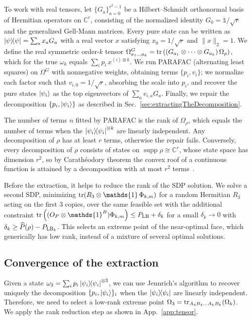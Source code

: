 \documentclass[aps,pra,twocolumn,showpacs,superscriptaddress,groupedaddress]{revtex4-2}
\newcommand{\ot}[0]{\otimes}
\newcommand{\one}[0]{\mathds{1}}
\newcommand{\C}{\mathds{C}}
\newcommand{\I}{\one}
\begin{document}
\begin{widetext}
To work with real tensors, let $\{G_a\}_{a=0}^{r^2-1}$ be a Hilbert--Schmidt orthonormal basis of Hermitian operators on $\C^r$, consisting of the normalized identity $G_0=\I/\sqrt r$ and the generalized Gell-Mann matrices. Every pure state can be written as $\dyad{\psi}=\sum_ax_aG_a$ with a real vector $x$ satisfying $x_0=1/\sqrt r$ and $\|x\|_2=1$. We define the real symmetric order-$k$ tensor $\Omega^G_{a_1\dots a_k}=\tr\left((G_{a_1}\otimes\dots\otimes G_{a_k})\,\Omega_\rho\right)$, which for the true $\omega_k$ equals $\sum_ip_i\,x^{(i)\otimes k}$. We run PARAFAC (alternating least squares) on $\Omega^G$ with nonnegative weights, obtaining terms $\{p_i,v_i\}$; we normalize each factor such that $v_{i,0}=1/\sqrt r$, absorbing the scale into $p_i$, and recover the pure states $\ket{\psi_i}$ as the top eigenvectors of $\sum_av_{i,a}G_a$. Finally, we repair the decomposition $\{p_i,\ket{\psi_i}\}$ as described in Sec.~\ref{sec:extractingTheDecomposition}.


The number of terms $n$ fitted by PARAFAC is the rank of $\Omega_\rho$, which equals the number of terms when the $\dyad{\psi_i}^{\otimes k}$ are linearly independent. 
Any decomposition of $\rho$ has at least $r$ terms, otherwise the repair fails. Conversely, every decomposition of $\rho$ consists of states on $\operatorname{supp}\rho\cong\C^r$, whose state space has dimension $r^2$, so by Carath\'eodory theorem the convex roof of a continuous function is attained by a decomposition with at most $r^2$ terms~\cite[Lemma~A-2]{Uhlmann1998}. 

Before the extraction, it helps to reduce the rank of the SDP solution. We solve a second SDP, minimizing $\tr(R_3 \ot \I \,\Phi_{k,m})$ for a random Hermitian $R_3$ acting on the first $3$ copies, over the same feasible set with the additional constraint $\tr\left((O_P\otimes\I^B)\Phi_{k,m}\right)\leq P_{\rm LB}+\delta_k$ for a small $\delta_k\to0$ with $\delta_k \geq \widehat{P}(\rho)-P_{{\rm LB}_k}$. This selects an extreme point of the near-optimal face, which generically has low rank, instead of a mixture of several optimal solutions. 

\subsection{Convergence of the extraction}\label{app:extractionConv}
Given a state $\omega_3 = \sum_i p_i \dyad{\psi_i}^{\otimes 3}$, we can use Jennrich's algorithm to recover uniquely the decomposition $\{p_i, \ket{\psi_i}\}_i$ when the $\dyad{\psi_i}$ are linearly independent. Therefore, we need to select a low-rank extreme point $\Omega_3 = \tr_{A_4B_4\dots A_kB_k}(\Omega_k)$. We apply the rank reduction step as shown in App.~\ref{app:tensor}.


\end{widetext}
\end{document}
